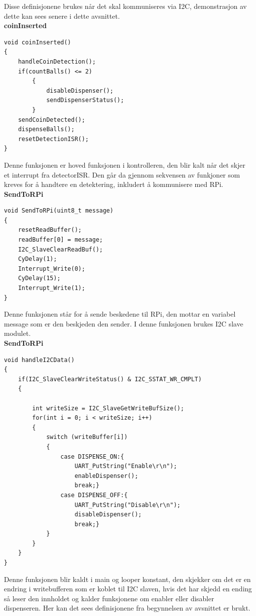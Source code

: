 \documentclass[Softwaredesign/Softwaredesign_main.tex]{subfiles}
\begin{document}
Disse definisjonene brukes når det skal kommuniseres via I2C, demonstrasjon av dette kan sees senere i dette avsnittet.\\

{\textbf{coinInserted}}\\
\begin{lstlisting}[caption={Hoved kontrol funksjonen til ballDispenser},style=customc,label={lst:dispenserControlFunction}]
void coinInserted()
{
    handleCoinDetection();
    if(countBalls() <= 2)
        {
            disableDispenser(); 
            sendDispenserStatus();
        }
    sendCoinDetected();
    dispenseBalls();
    resetDetectionISR();
}
\end{lstlisting}
Denne funksjonen er hoved funksjonen i kontrolleren, den blir kalt når det skjer et interrupt fra detectorISR. Den går da gjennom sekvensen av funkjoner som kreves for å handtere en detektering, inkludert å kommunisere med RPi.\\

{\textbf{SendToRPi}}\\
\begin{lstlisting}[caption={Komunikasjon fra Ball Dispenser til RPi},style=customc,label={lst:dispenserControlFunction}]
void SendToRPi(uint8_t message)
{
    resetReadBuffer();
    readBuffer[0] = message;
    I2C_SlaveClearReadBuf();
    CyDelay(1);
    Interrupt_Write(0);
    CyDelay(15);
    Interrupt_Write(1);
}
\end{lstlisting}

Denne funksjonen står for å sende beskedene til RPi, den mottar en variabel message som er den beskjeden den sender. I denne funksjonen brukes I2C slave modulet.\\

{\textbf{SendToRPi}}\\
\begin{lstlisting}[caption={Komunikasjon fra RPi til Ball Dispenser},style=customc,label={lst:dispenserControlFunction}]
void handleI2CData()
{
    if(I2C_SlaveClearWriteStatus() & I2C_SSTAT_WR_CMPLT)
    {
        
        int writeSize = I2C_SlaveGetWriteBufSize();
        for(int i = 0; i < writeSize; i++)
        {
            switch (writeBuffer[i])
            {
                case DISPENSE_ON:{
                    UART_PutString("Enable\r\n");
                    enableDispenser();
                    break;}
                case DISPENSE_OFF:{
                    UART_PutString("Disable\r\n");
                    disableDispenser();
                    break;} 
            }
        }
    }
}
\end{lstlisting}
Denne funksjonen blir kaldt i main og looper konstant, den skjekker om det er en endring i writebufferen som er koblet til I2C slaven, hvis det har skjedd en ending så leser den innholdet og kalder funksjonene om enabler eller disabler dispenseren. Her kan det sees definisjonene fra begynnelsen av avsnittet er brukt.
\end{document}
